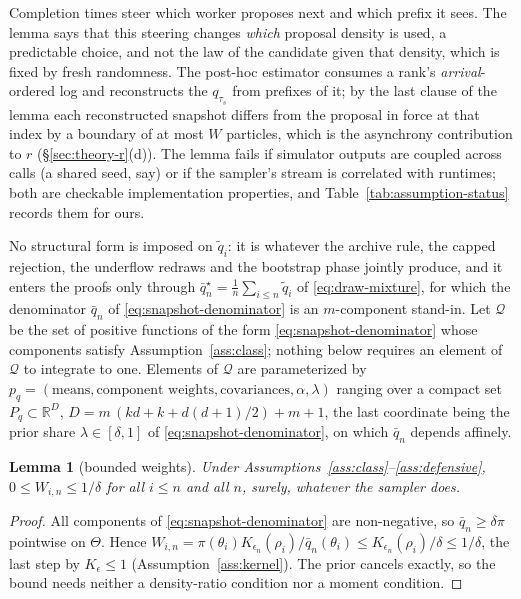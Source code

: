 \documentclass[10pt]{article}
\theoremstyle{plain}
\newtheorem{lemma}[theorem]{Lemma}
\theoremstyle{definition}
\begin{document}
Completion times steer which worker proposes next and which prefix it sees. The lemma says that this steering changes \emph{which} proposal density is used, a predictable choice, and not the law of the candidate given that density, which is fixed by fresh randomness. The post-hoc estimator consumes a rank's \emph{arrival}-ordered log and reconstructs the $q_{\tau_s}$ from prefixes of it; by the last clause of the lemma each reconstructed snapshot differs from the proposal in force at that index by a boundary of at most $W$ particles, which is the asynchrony contribution to $r$ (\S\ref{sec:theory-r}(d)). The lemma fails if simulator outputs are coupled across calls (a shared seed, say) or if the sampler's stream is correlated with runtimes; both are checkable implementation properties, and Table~\ref{tab:assumption-status} records them for ours.

No structural form is imposed on $\tilde q_i$: it is whatever the archive rule, the capped rejection, the underflow redraws and the bootstrap phase jointly produce, and it enters the proofs only through $\bar q^\star_n=\tfrac1n\sum_{i\le n}\tilde q_i$ of \eqref{eq:draw-mixture}, for which the denominator $\bar q_n$ of \eqref{eq:snapshot-denominator} is an $m$-component stand-in. Let $\mathcal{Q}$ be the set of positive functions of the form \eqref{eq:snapshot-denominator} whose components satisfy Assumption~\ref{ass:class}; nothing below requires an element of $\mathcal{Q}$ to integrate to one. Elements of $\mathcal{Q}$ are parameterized by $p_q=(\text{means},\text{component weights},\text{covariances},\alpha,\lambda)$ ranging over a compact set $P_q\subset\mathbb{R}^{D}$, $D=m\,(kd+k+d(d+1)/2)+m+1$, the last coordinate being the prior share $\lambda\in[\delta,1]$ of \eqref{eq:snapshot-denominator}, on which $\bar q_n$ depends affinely.

\begin{lemma}[bounded weights]\label{lem:bounded}
Under Assumptions~\ref{ass:class}--\ref{ass:defensive}, $0\le W_{i,n}\le1/\delta$ for all $i\le n$ and all $n$, surely, whatever the sampler does.
\end{lemma}
\begin{proof}
All components of \eqref{eq:snapshot-denominator} are non-negative, so $\bar q_n\ge\delta\pi$ pointwise on $\Theta$. Hence $W_{i,n}=\pi(\theta_i)K_{\epsilon_n}(\rho_i)/\bar q_n(\theta_i)\le K_{\epsilon_n}(\rho_i)/\delta\le1/\delta$, the last step by $K_\epsilon\le1$ (Assumption~\ref{ass:kernel}). The prior cancels exactly, so the bound needs neither a density-ratio condition nor a moment condition.
\end{proof}
\end{document}
